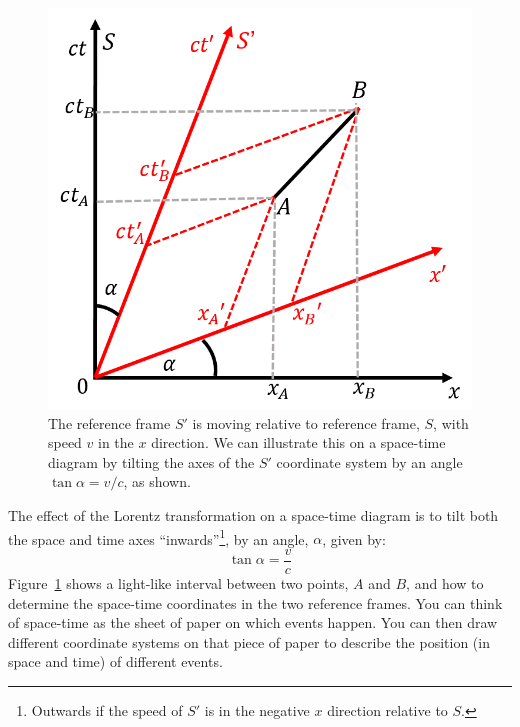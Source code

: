 \begin{figure}[!htbp]
\centering
\includegraphics[width=0.6\linewidth]{files/lorentz-f7121c5a4528f9422e6c506f6f1a6d4b.png}
\caption[]{The reference frame $S'$ is moving relative to reference frame, $S$, with speed $v$ in the $x$ direction. We can illustrate this on a space-time diagram by tilting the axes of the $S'$ coordinate system by an angle $\tan\alpha=v/c$, as shown.}
\label{fig:specialrelativity:lorentz}
\end{figure}

The effect of the Lorentz transformation on a space-time diagram is to tilt both the space and time axes ``inwards''\footnote{Outwards if the speed of $S'$ is in the negative $x$ direction relative to $S$.}, by an angle, $\alpha$, given by:
\begin{equation}
\tan\alpha = \frac{v}{c}
\end{equation}
Figure~\ref{fig:specialrelativity:lorentz} shows a light-like interval between two points, $A$ and $B$, and how to determine the space-time coordinates in the two reference frames. You can think of space-time as the sheet of paper on which events happen. You can then draw different coordinate systems on that piece of paper to describe the position (in space and time) of different events.

